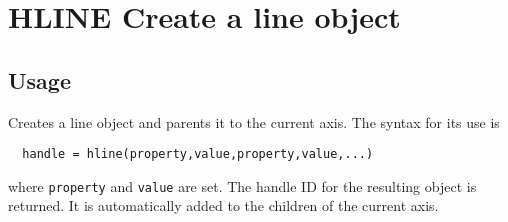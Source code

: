 \section{HLINE Create a line object}

\subsection{Usage}

Creates a line object and parents it to the current axis.  The
syntax for its use is 
\begin{verbatim}
  handle = hline(property,value,property,value,...)
\end{verbatim}
where \verb|property| and \verb|value| are set.  The handle ID for the
resulting object is returned.  It is automatically added to
the children of the current axis.
